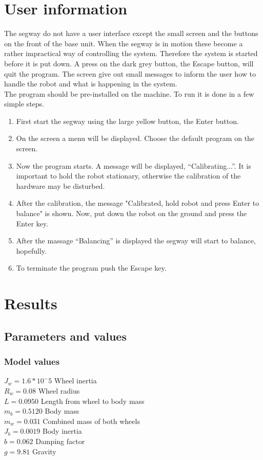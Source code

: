 \documentclass[a4paper]{article}
\begin{document}
\section{User information}

The segway do not have a user interface except the small screen and the buttons on the front of the base unit. When the segway is in motion these become a rather impractical way of controlling the system. Therefore the system is started before it is put down. A press on the dark grey button, the Escape button, will quit the program. The screen give out small messages to inform the user how to handle the robot and what is happening in the system.\\

The program should be pre-installed on the machine. To run it is done in a few simple steps.

\begin{enumerate}
\item First start the segway using the large yellow button, the Enter button.
\item On the screen a menu will be displayed. Choose the default program on the screen.
\item Now the program starts. A message will be displayed, “Calibrating...”. It is important to hold the robot stationary, otherwise the calibration of the hardware may be disturbed.
\item After the calibration, the message "Calibrated, hold robot and press Enter to balance" is shown. Now, put down the robot on the ground and press the Enter key.
\item After the massage “Balancing” is displayed the segway will start to balance, hopefully.
\item To terminate the program push the Escape key.
\end{enumerate}

\section{Results}
\subsection{Parameters and values}
\subsubsection*{Model values}
$J_w = 1.6*10^-5$ Wheel inertia \\
$R_w = 0.08$ Wheel radius \\
$L = 0.0950$ Length from wheel to body mass \\
$m_b = 0.5120$ Body mass \\
$m_w = 0.031$ Combined mass of both wheels \\
$J_b = 0.0019$ Body inertia \\
$b = 0.062$ Damping factor \\
$g = 9.81$ Gravity \\ \\
\end{document}
